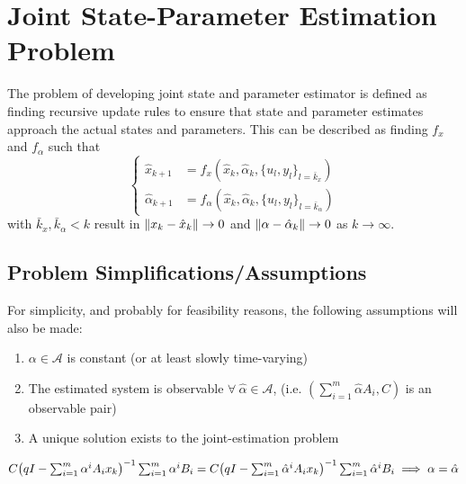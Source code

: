 \documentclass[]{ieeetran}
\begin{document}
\section{Joint State-Parameter Estimation Problem}
The problem of developing joint state and parameter estimator is defined as finding recursive update rules to ensure that state and parameter estimates approach the actual states and parameters. This can be described as finding $f_x$ and $f_\alpha$ such that
\begin{equation}\label{eq:est_pblm_statement}
	\begin{cases}
		\hat{x}_{k+1} 		&= f_x(\hat{x}_k, \hat{\alpha}_k, \{u_l, y_l\}_{l=\bar{k}_x})\\
		\hat{\alpha}_{k+1} 	&= f_\alpha(\hat{x}_k, \hat{\alpha}_k, \{u_l, y_l\}_{l=\bar{k}_\alpha})
	\end{cases}
\end{equation}
with $\bar{k}_x, \bar{k}_\alpha < k$ result in $\norm{x_k - \hat{x}_k} \to 0$ and $\norm{\alpha - \hat{\alpha}_k} \to 0$ as $k \to \infty$.

\subsection{Problem Simplifications/Assumptions \cite{beelen2017joint}}
For simplicity, and probably for feasibility reasons, the following assumptions will also be made:

\begin{enumerate}
	\item $\alpha \in \mathcal{A}$ is constant (or at least slowly time-varying)
	\item The estimated system is observable $\forall \ \hat{\alpha} \in \mathcal{A}$, (i.e. $(\sum_{i=1}^m \hat{\alpha} A_i, C)$ is an observable pair)
	\item A unique solution exists to the joint-estimation problem
\end{enumerate}
$C \qty(q I - \sum_{i=1}^{m} \alpha^i A_i x_k)^{-1} \sum_{i=1}^m \alpha^i B_i \\= C \qty(q I - \sum_{i=1}^{m} \hat{\alpha}^i A_i x_k)^{-1} \sum_{i=1}^m \hat{\alpha}^i B_i \implies \alpha = \hat{\alpha}$
\end{document}
